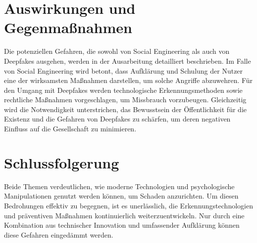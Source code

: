 \section*{Auswirkungen und Gegenmaßnahmen}

Die potenziellen Gefahren, die sowohl von Social Engineering als auch von Deepfakes ausgehen, werden in der Ausarbeitung detailliert beschrieben.
Im Falle von Social Engineering wird betont, dass Aufklärung und Schulung der Nutzer eine der wirksamsten Maßnahmen darstellen, um solche Angriffe abzuwehren.
Für den Umgang mit Deepfakes werden technologische Erkennungsmethoden sowie rechtliche Maßnahmen vorgeschlagen, um Missbrauch vorzubeugen.
Gleichzeitig wird die Notwendigkeit unterstrichen, das Bewusstsein der Öffentlichkeit für die Existenz und die Gefahren von Deepfakes zu schärfen, um deren negativen Einfluss auf die Gesellschaft zu minimieren.

\section*{Schlussfolgerung}

 Beide Themen verdeutlichen, wie moderne Technologien und psychologische Manipulationen genutzt werden können, um Schaden anzurichten.
 Um diesen Bedrohungen effektiv zu begegnen, ist es unerlässlich, die Erkennungstechnologien und präventiven Maßnahmen kontinuierlich weiterzuentwickeln.
 Nur durch eine Kombination aus technischer Innovation und umfassender Aufklärung können diese Gefahren eingedämmt werden.
